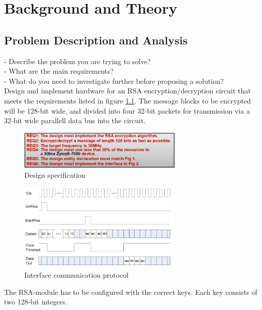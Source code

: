 \chapter{Background and Theory}
\section{Problem Description and Analysis}

- Describe the problem you are trying to solve?\\
- What are the main requirements?\\
- What do you need to investigate further before proposing a solution?\\

Design and implement hardware for an RSA encryption/decryption circuit that meets the requirements listed in figure \ref{fig:req}. The message blocks to be encrypted will be 128-bit wide, and divided into four 32-bit packets for transmission via a 32-bit wide parallell data bus into the circuit.
\begin{figure}[H]
\centering
\includegraphics[width=0.7\textwidth]{images/requierements.PNG}
\caption{Design specification}
\label{fig:req}
\end{figure}
\begin{figure}[H]
\centering
\includegraphics[width=0.7\textwidth]{images/communication.PNG}
\caption{Interface communication protocol}
\label{fig:interface}
\end{figure}
The RSA-module has to be configured with the correct keys. Each key consists of two 128-bit integers.


